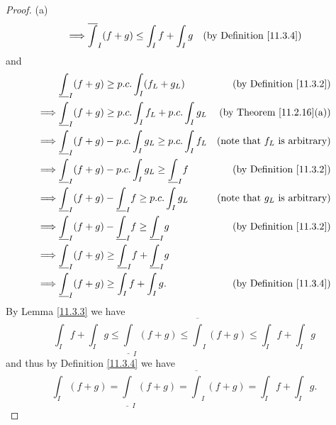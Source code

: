\begin{proof}{(a)}
\begin{align*}
        \implies & \overline{\int}_I (f + g) \leq \int_I f + \int_I g                       & \text{(by Definition \ref{11.3.4})}
    \end{align*}
    and
    \begin{align*}
                 & \underline{\int}_I (f + g) \geq p.c. \int_I (f_L + g_L)                     & \text{(by Definition \ref{11.3.2})}     \\
        \implies & \underline{\int}_I (f + g) \geq p.c. \int_I f_L + p.c. \int_I g_L           & \text{(by Theorem \ref{11.2.16}(a))}    \\
        \implies & \underline{\int}_I (f + g) - p.c. \int_I g_L \geq p.c. \int_I f_L           & \text{(note that \(f_L\) is arbitrary)} \\
        \implies & \underline{\int}_I (f + g) - p.c. \int_I g_L \geq \underline{\int}_I f      & \text{(by Definition \ref{11.3.2})}     \\
        \implies & \underline{\int}_I (f + g) - \underline{\int}_I f \geq p.c. \int_I g_L      & \text{(note that \(g_L\) is arbitrary)} \\
        \implies & \underline{\int}_I (f + g) - \underline{\int}_I f \geq \underline{\int}_I g & \text{(by Definition \ref{11.3.2})}     \\
        \implies & \underline{\int}_I (f + g) \geq \underline{\int}_I f + \underline{\int}_I g &                                         \\
        \implies & \underline{\int}_I (f + g) \geq \int_I f + \int_I g.                        & \text{(by Definition \ref{11.3.4})}
    \end{align*}
    By Lemma \ref{11.3.3} we have
    \[
        \int_I f + \int_I g \leq \underline{\int}_I (f + g) \leq \overline{\int}_I (f + g) \leq \int_I f + \int_I g
    \]
    and thus by Definition \ref{11.3.4} we have
    \[
        \int_I (f + g) = \underline{\int}_I (f + g) = \overline{\int}_I (f + g) = \int_I f + \int_I g.
    \]
\end{proof}


